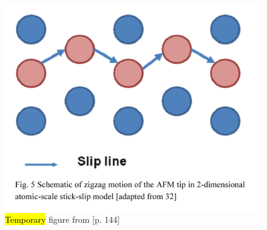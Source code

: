 \begin{figure}[H]
  \centering
  \includegraphics[width=0.5\linewidth]{figures/theory/slip_line.png}
  \caption{\hl{Temporary} figure from \cite{kim_nano-scale_2009}[p. 144]}
  \label{fig:slip_line}
\end{figure}










